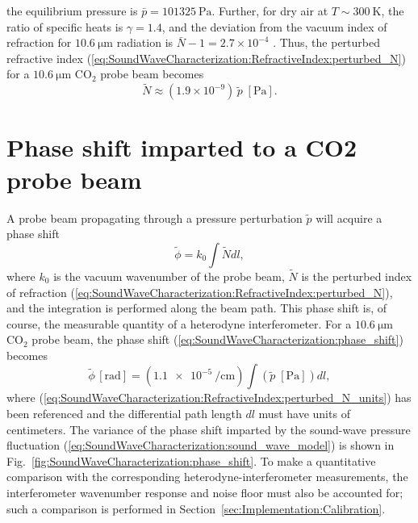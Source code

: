 the equilibrium pressure is $\bar{p} = \SI{101325}{\pascal}$.
Further, for dry air at $T \sim \SI{300}{\kelvin}$,
the ratio of specific heats is $\gamma = 1.4$, and
the deviation from the vacuum index of refraction
for $\SI{10.6}{\micro\meter}$ radiation is
$\bar{N} - 1 = 2.7 \times 10^{-4}$
\cite{marchetti_ipt06, mathar_N_IR_07, refractive_index_database}.
Thus, the perturbed refractive index
(\ref{eq:SoundWaveCharacterization:RefractiveIndex:perturbed_N})
for a $\SI{10.6}{\micro\meter}$ CO$_2$ probe beam becomes
\begin{equation}
  \tilde{N}
  \approx
  (1.9 \times 10^{-9})
  \,
  \tilde{p} \; [\text{Pa}].
  \label{eq:SoundWaveCharacterization:RefractiveIndex:perturbed_N_units}
\end{equation}


\section{Phase shift imparted to a CO2 probe beam}
\label{sec:SoundWaveCharacterization:PhaseShift}
A probe beam propagating through a pressure perturbation $\tilde{p}$
will acquire a phase shift
\begin{equation}
  \tilde{\phi}
  =
  k_0 \int \tilde{N} dl,
  \label{eq:SoundWaveCharacterization:phase_shift}
\end{equation}
where $k_0$ is the vacuum wavenumber of the probe beam,
$\tilde{N}$ is the perturbed index of refraction
(\ref{eq:SoundWaveCharacterization:RefractiveIndex:perturbed_N}), and
the integration is performed along the beam path.
This phase shift is, of course,
the measurable quantity of a heterodyne interferometer.
For a $\SI{10.6}{\micro\meter}$ CO$_2$ probe beam,
the phase shift (\ref{eq:SoundWaveCharacterization:phase_shift}) becomes
\begin{equation}
  \tilde{\phi} \, [\text{rad}]
  =
  (\SI{1.1e-5}{\per\centi\meter})
  \int
  (\tilde{p} \; [\text{Pa}])
  dl,
  \label{eq:SoundWaveCharacterization:phase_shift_units}
\end{equation}
where (\ref{eq:SoundWaveCharacterization:RefractiveIndex:perturbed_N_units})
has been referenced and
the differential path length $dl$ must have units of centimeters.
The variance of the phase shift imparted
by the sound-wave pressure fluctuation
(\ref{eq:SoundWaveCharacterization:sound_wave_model})
is shown in
Fig.~\ref{fig:SoundWaveCharacterization:phase_shift}.
To make a quantitative comparison
with the corresponding heterodyne-interferometer measurements,
the interferometer wavenumber response and noise floor
must also be accounted for;
such a comparison is performed in
Section~\ref{sec:Implementation:Calibration}.

